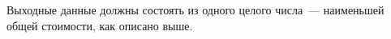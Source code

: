 Выходные данные должны состоять из одного целого числа~--- наименьшей общей стоимости, как
описано выше. 